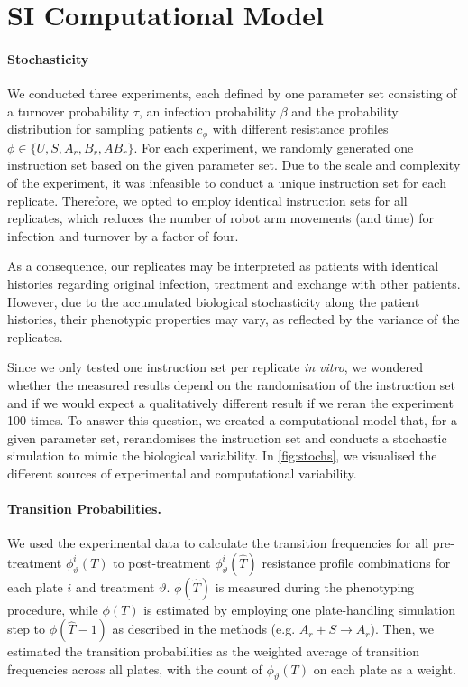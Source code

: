 \section{SI Computational Model\label{ssec: model}}
\paragraph{Stochasticity}
We conducted three experiments, each defined by one parameter set consisting of a turnover probability $\tau$, an infection probability $\beta$ and the probability distribution for sampling patients $c_\phi$ with different resistance profiles $\phi \in \{U, S, A_r, B_r, AB_r\}$.
For each experiment, we randomly generated one instruction set based on the given parameter set.
Due to the scale and complexity of the experiment, it was infeasible to conduct a unique instruction set for each replicate.
Therefore, we opted to employ identical instruction sets for all replicates, which reduces the number of robot arm movements (and time) for infection and turnover by a factor of four.

As a consequence, our replicates may be interpreted as patients with identical histories regarding original infection, treatment and exchange with other patients.
However, due to the accumulated biological stochasticity along the patient histories, their phenotypic properties may vary, as reflected by the variance of the replicates.

Since we only tested one instruction set per replicate \textit{in vitro}, we wondered whether the measured results depend on the randomisation of the instruction set and if we would expect a qualitatively different result if we reran the experiment 100 times.
To answer this question, we created a computational model that, for a given parameter set, rerandomises the instruction set and conducts a stochastic simulation to mimic the biological variability.
In \autoref{fig:stochs}, we visualised the different sources of experimental and computational variability.

\paragraph{Transition Probabilities.}
We used the experimental data to calculate the transition frequencies for all pre-treatment $\phi^i_\vartheta(T)$ to post-treatment $\phi^i_\vartheta(\hat{T})$ resistance profile combinations for each plate $i$ and treatment $\vartheta$.
$\phi(\hat{T})$ is measured during the phenotyping procedure, while $\phi(T)$ is estimated by employing one plate-handling simulation step to $\phi(\hat{T}-1)$ as described in the methods (e.g. $A_r  + S \rightarrow A_r$).
Then, we estimated the transition probabilities as the weighted average of transition frequencies across all plates, with the count of $\phi_\vartheta(T)$ on each plate as a weight.

